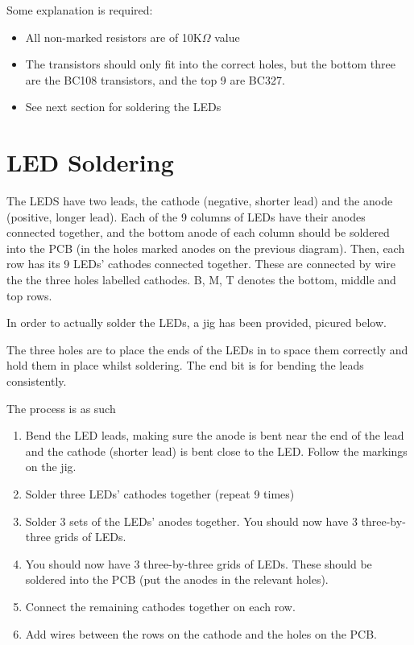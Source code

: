 \documentclass{article}
\begin{document}
Some explanation is required: 
\begin{itemize}
\item All non-marked resistors are of 10K$\Omega$ value

\item The transistors should only fit into the correct holes, but the
bottom three are the BC108 transistors, and the top 9 are BC327.

\item See next section for soldering the LEDs
\end{itemize}

\section{LED Soldering}
The LEDS have two leads, the cathode (negative, shorter lead) and the 
anode (positive, longer lead). Each of the 9 columns of LEDs have their
anodes connected together, and the bottom anode of each column should be
soldered into the PCB (in the holes marked anodes on the previous 
diagram). Then, each row has its 9 LEDs' cathodes connected together. 
These are connected by wire the the three holes labelled cathodes. B, M, 
T denotes the bottom, middle and top rows.

In order to actually solder the LEDs, a jig has been provided, picured 
below. %


The three holes are to place the ends of the LEDs in to space them 
correctly and hold them in place whilst soldering. The end bit is for 
bending the leads consistently. 

The process is as such
\begin{enumerate}
\item Bend the LED leads, making sure the anode is bent near the end of
the lead and the cathode (shorter lead) is bent close to the LED. Follow
the markings on the jig.

\item Solder three LEDs' cathodes together (repeat 9 times)

\item Solder 3 sets of the LEDs' anodes together. You should now have 3 
three-by-three grids of LEDs. 

\item You should now have 3 three-by-three grids of LEDs. These should 
be soldered into the PCB (put the anodes in the relevant holes).

\item Connect the remaining cathodes together on each row.

\item Add wires between the rows on the cathode and the holes on the 
PCB.

\end{enumerate}
\end{document}
